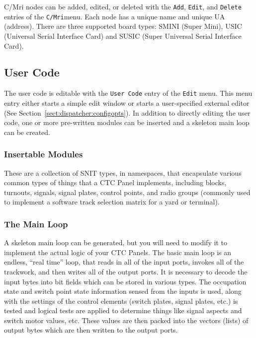 C/Mri nodes can be added, edited, or deleted with the \verb=Add=,
\verb=Edit=, and \verb=Delete= entries of the \verb=C/Mri=menu. Each
node has a unique name and unique UA (address).  There are three
supported board types: SMINI (Super Mini), USIC (Universal Serial
Interface Card) and SUSIC (Super Universal Serial Interface Card).

\subsection{User Code}

The user code is editable with the \verb=User Code= entry of the
\verb=Edit= menu.  This menu entry either starts a simple edit window or
starts a user-specified external editor (See
Section~\ref{sect:dispatcher:configopts}).  In addition to directly
editing the user code, one or more pre-written modules can be inserted
and a skeleton main loop can be created.

\subsubsection{Insertable Modules}

These are a collection of SNIT types, in namespaces, that encapsulate
various common types of things that a CTC Panel implements, including
blocks, turnouts, signals, signal plates, control points, and radio
groups (commonly used to implement a software track selection matrix for
a yard or terminal).

\subsubsection{The Main Loop}

A skeleton main loop can be generated, but you will need to modify it to
implement the actual logic of your CTC Panels.  The basic main loop is an
endless, ``real time'' loop, that reads in all of the input ports,
invokes all of the trackwork, and then writes all of the output ports. 
It is necessary to decode the input bytes into bit fields which can be
stored in various types.  The occupation state and switch point state
information sensed from the inputs is used, along with the settings of
the control elements (switch plates, signal plates, etc.) is tested and
logical tests are applied to determine things like signal aspects and
switch motor values, etc. These values are then packed into the vectors
(lists) of output bytes which are then written to the output ports.

